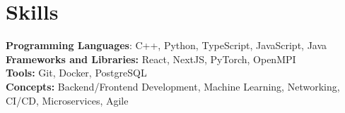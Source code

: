\documentclass[11pt]{article}
\begin{document}
\section{Skills}
    \quad\small{\textbf{Programming Languages}: C++, Python, TypeScript, JavaScript, Java}\\\vspace{0.2em}
    \quad\small{\textbf{Frameworks and Libraries:} React, NextJS, PyTorch, OpenMPI}\\\vspace{0.2em}
    \quad\small{\textbf{Tools:} Git, Docker, PostgreSQL}\\\vspace{0.2em}
    \quad\small{\textbf{Concepts:} Backend/Frontend Development, Machine Learning, Networking, CI/CD, Microservices, Agile}
\end{document}
